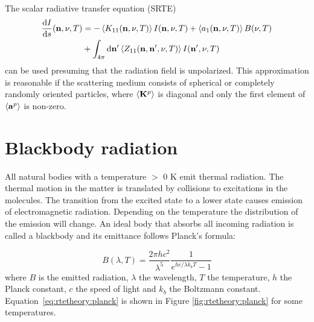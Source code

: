 The scalar radiative transfer equation (SRTE)
\begin{eqnarray}
  \label{eq:rtetheory:SRTE}
  \frac{\mathrm{d} I}{\mathrm{d} s} ({\bf n}, \nu, T)& = 
  -\left\langle  K_{11}({\bf n}, \nu, T) \right\rangle I({\bf n}, \nu, T) +
  \left\langle  a_1({\bf n}, \nu, T) \right\rangle B(\nu, T)   \nonumber\\
  &+\int_{4\pi} \mathrm{d} {\bf n}' \left\langle  Z_{11}({\bf n},
  {\bf n}', \nu, T)  \right\rangle I({\bf n}', \nu, T)
\end{eqnarray}
can be used presuming that the radiation field is unpolarized.  This
approximation is reasonable if the scattering medium consists of
spherical or completely randomly oriented particles, where $\left\langle 
{\bf K}^p  \right\rangle$ is diagonal and only the first element of $\left\langle 
{\bf a}^p  \right\rangle$ is non-zero. 


 
\section{Blackbody radiation}
 \label{sec:rtetheory:rtetheory:planck}
 
 All natural bodies with a temperature $>$ 0 K emit thermal radiation.
 The thermal motion in the matter is translated by collisions to
 excitations in the molecules. The transition from the excited state
 to a lower state causes emission of electromagnetic radiation.
 Depending on the temperature the distribution of the emission will
 change. An ideal body that absorbs all incoming radiation is called a
 blackbody and its emittance follows Planck's formula: 

 \begin{equation}
   B(\lambda,T) = \frac{2\pi hc^2}{\lambda^5} \frac{1}{e^{hc/\lambda k_bT}-1}
  \label{eq:rtetheory:planck}
 \end{equation}
 where $B$ is the emitted radiation, $\lambda$ the wavelength, $T$ the 
 temperature, $h$ the Planck constant, $c$ the speed of light and $k_b$
 the Boltzmann constant. Equation~\ref{eq:rtetheory:planck} is shown in Figure 
 \ref{fig:rtetheory:planck} for some temperatures.


